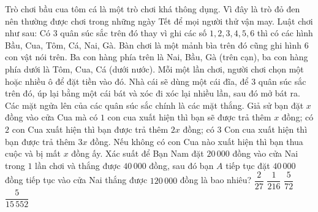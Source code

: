 \begin{ex}%
	Trò chơi bầu cua tôm cá là một trò chơi khá thông dụng. Vì đây là trò đỏ đen nên thường được chơi trong những ngày Tết để mọi người thử vận may. Luật chơi như sau: Có $3$ quân súc sắc trên đó thay vì ghi các số $1,2,3,4,5,6$ thì có các hình Bầu, Cua, Tôm, Cá, Nai, Gà. Bàn chơi là một mảnh bìa trên đó cũng ghi hình $6$ con vật nói trên. Ba con hàng phía trên là Nai, Bầu, Gà (trên cạn), ba con hàng phía dưới là Tôm, Cua, Cá (dưới nước). Mỗi một lần chơi, người chơi chọn một hoặc nhiều ô để đặt tiền vào đó. Nhà cái sẽ dùng một cái đĩa, để $3$ quân súc sắc trên đó, úp lại bằng một cái bát và xóc đi xóc lại nhiều lần, sau đó mở bát ra. Các mặt ngửa lên của các quân súc sắc chính là các mặt thắng. Giả sử bạn đặt $x$ đồng vào cửa Cua mà có $1$ con cua xuất hiện thì bạn sẽ được trả thêm $x$ đồng; có $2$ con Cua xuất hiện thì bạn được trả thêm $2x$ đồng; có $3$ Con cua xuất hiện thì bạn được trả thêm  $3x$ đồng. Nếu không có con Cua nào xuất hiện thì bạn thua cuộc và bị mất $x$ đồng ấy. Xác suất để Bạn Nam đặt $20\,000$ đồng vào cửa Nai trong $1$ lần chơi và thắng được $40\,000$ đồng, sau đó bạn $A$ tiếp tục đặt $40\,000$ đồng tiếp tục vào cửa Nai thắng được $120\,000$ đồng là bao nhiêu?
	 \choice
		{$\dfrac{2}{27}$} 
		 {$\dfrac{1}{216}$}
		 {$\dfrac{5}{72}$}
		{\True $\dfrac{5}{15\,552}$} 
\end{ex}

